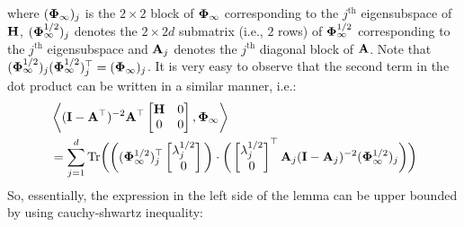 where $(\boldsymbol{\Phi}_{\infty})_j$ is the $2\times 2$ block of $\boldsymbol{\Phi}_{\infty}$ corresponding to the $j^{\textrm{th}}$ eigensubspace of $\mathbf{H}$,  $(\boldsymbol{\Phi}_{\infty}^{1/2})_j$ denotes the $2\times 2d$ submatrix (i.e., $2$ rows) of $\boldsymbol{\Phi}_{\infty}^{1/2}$ corresponding to the $j^{\textrm{th}}$ eigensubspace and $\mathbf{A}_j$ denotes the $j^{\textrm{th}}$ diagonal block of $\mathbf{A}$. Note that $(\boldsymbol{\Phi}_{\infty}^{1/2})_j (\boldsymbol{\Phi}_{\infty}^{1/2})_j ^{\top} = (\boldsymbol{\Phi}_{\infty})_j$.
It is very easy to observe that the second term in the dot product can be written in a similar manner, i.e.:
\begin{align*}
&\left\langle (\mathbf{I}-\mathbf{A}^{\top})^{-2}\mathbf{A}^{\top}\begin{bmatrix}\mathbf{H}&0\\0&0\end{bmatrix}, \boldsymbol{\Phi}_{\infty} \right\rangle\\
&=\sum_{j=1}^{d}\text{Tr}\bigg(\bigg((\boldsymbol{\Phi}_{\infty}^{1/2})_j^{\top}\begin{bmatrix}\lambda_j^{1/2}\\0\end{bmatrix}\bigg)\cdot\bigg(\begin{bmatrix}\lambda_j^{1/2}\\0\end{bmatrix}^{\top}\mathbf{A}_j(\mathbf{I}-\mathbf{A}_j)^{-2} (\boldsymbol{\Phi}_{\infty}^{1/2})_j \bigg)\bigg)
\end{align*}
So, essentially, the expression in the left side of the lemma can be upper bounded by using cauchy-shwartz inequality:
